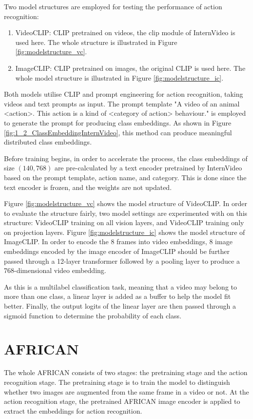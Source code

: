Two model structures are employed for testing the performance of action recognition: 
\begin{enumerate}
    \item VideoCLIP: CLIP pretrained on videos, the clip module of InternVideo \parencite{wang2022internvideo} is used here. The whole structure is illustrated in Figure \ref{fig:modelstructure_vc}.
    \item ImageCLIP: CLIP pretrained on images, the original CLIP \parencite{radford2021learning} is used here. The whole model structure is illustrated in Figure \ref{fig:modelstructure_ic}.
\end{enumerate}

Both models utilise CLIP and prompt engineering for action recognition, taking videos and text prompts as input. The prompt template "A video of an animal
<action>. This action is a kind of <category of action> behaviour." is employed to generate the prompt for producing class embeddings. As shown in Figure \ref{fig:1_2_ClassEmbeddingInternVideo}, this method can produce meaningful distributed class embeddings.

Before training begins, in order to accelerate the process, the class embeddings of size $(140, 768)$ are pre-calculated by a text encoder pretrained by InternVideo based on the prompt template, action name, and category. This is done since the text encoder is frozen, and the weights are not updated. 

Figure \ref{fig:modelstructure_vc} shows the model structure of VideoCLIP. In order to evaluate the structure fairly, two model settings are experimented with on this structure: VideoCLIP training on all vision layers, and VideoCLIP training only on projection layers. Figure \ref{fig:modelstructure_ic} shows the model structure of ImageCLIP. In order to encode the 8 frames into video embeddings, 8 image embeddings encoded by the image encoder of ImageCLIP should be further passed through a 12-layer transformer followed by a pooling layer to produce a 768-dimensional video embedding.

As this is a multilabel classification task, meaning that a video may belong to more than one class, a linear layer is added as a buffer to help the model fit better. Finally, the output logits of the linear layer are then passed through a sigmoid function to determine the probability of each class. 

\section{AFRICAN}
The whole AFRICAN consists of two stages: the pretraining stage and the action recognition stage. The pretraining stage is to train the model to distinguish whether two images are augmented from the same frame in a video or not. At the action recognition stage, the pretrained AFRICAN image encoder is applied to extract the embeddings for action recognition. 

